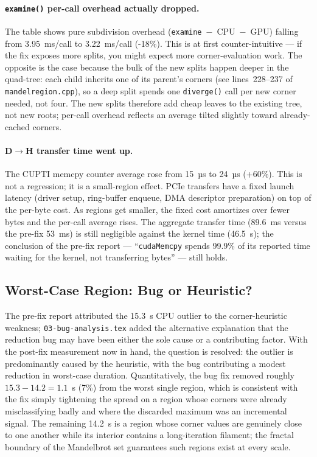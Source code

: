 \documentclass[
	english,
	letterpaper, oneside
]{article}
\begin{document}
\paragraph{\texttt{examine()} per-call overhead actually dropped.} The
table shows pure subdivision overhead (\texttt{examine}~$-$~CPU~$-$~GPU)
falling from 3.95~ms/call to 3.22~ms/call (-18\%). This is at first
counter-intuitive --- if the fix exposes more splits, you might expect
more corner-evaluation work. The opposite is the case because the bulk
of the new splits happen deeper in the quad-tree: each child
inherits one of its parent's corners (see lines~228--237 of
\texttt{mandelregion.cpp}), so a deep split spends one
\texttt{diverge()} call per new corner needed, not four. The new splits
therefore add cheap leaves to the existing tree, not new roots; per-call
overhead reflects an average tilted slightly toward already-cached
corners.

\paragraph{D$\rightarrow$H transfer time went up.} The CUPTI memcpy
counter average rose from 15~µs to 24~µs (+60\%). This is not a
regression; it is a small-region effect. PCIe transfers have a fixed
launch latency (driver setup, ring-buffer enqueue, DMA descriptor
preparation) on top of the per-byte cost. As regions get smaller, the
fixed cost amortizes over fewer bytes and the per-call average rises.
The aggregate transfer time (89.6~ms versus the pre-fix 53~ms) is still
negligible against the kernel time (46.5~s); the conclusion of the
pre-fix report --- ``\texttt{cudaMemcpy} spends 99.9\% of its reported
time waiting for the kernel, not transferring bytes'' --- still holds.

\subsection{Worst-Case Region: Bug or Heuristic?}

The pre-fix report attributed the 15.3~s CPU outlier to the
corner-heuristic weakness; \texttt{03-bug-analysis.tex} added the
alternative explanation that the reduction bug may have been
either the sole cause or a contributing factor. With the post-fix
measurement now in hand, the question is resolved: the outlier is
predominantly caused by the heuristic, with the bug
contributing a modest reduction in worst-case duration. Quantitatively,
the bug fix removed roughly $15.3 - 14.2 = 1.1$~s (7\%) from the worst
single region, which is consistent with the fix simply tightening the
spread on a region whose corners were already misclassifying badly and
where the discarded maximum was an incremental signal. The remaining
14.2~s is a region whose corner values are genuinely close to one
another while its interior contains a long-iteration filament; the
fractal boundary of the Mandelbrot set guarantees such regions exist at
every scale.
\end{document}
